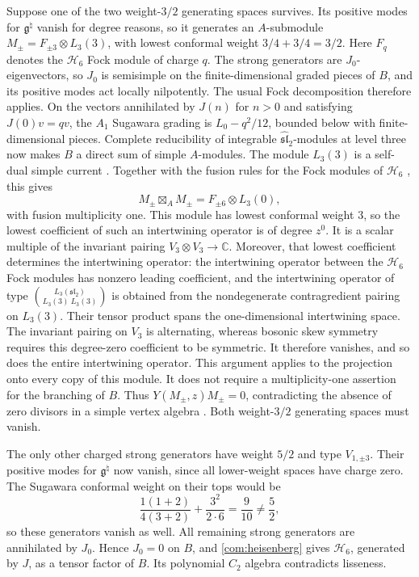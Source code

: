 \documentclass[11pt,a4paper]{amsart}
\numberwithin{equation}{section}
\theoremstyle{definition}
\theoremstyle{remark}
\newcommand{\C}{\mathbb C}
\newcommand{\g}{\mathfrak g}
\newcommand{\slg}{\mathfrak{sl}}
\begin{document}
Suppose one of the two weight-$3/2$ generating spaces survives.
Its positive modes for $\g^\natural$ vanish for degree reasons, so it generates
an $A$-submodule
$M_\pm=F_{\pm3}\otimes L_3(3)$, with lowest conformal weight
$3/4+3/4=3/2$. Here $F_q$ denotes the $\mathcal H_6$ Fock module
of charge $q$. The strong generators are $J_0$-eigenvectors, so $J_0$ is semisimple on
the finite-dimensional graded pieces of $B$, and its positive modes act locally nilpotently.
The usual Fock decomposition therefore applies. On the vectors annihilated by $J(n)$ for $n>0$ and satisfying
$J(0)v=qv$, the $A_1$ Sugawara grading is
$L_0-q^2/12$, bounded below with finite-dimensional pieces. Complete
reducibility of integrable $\widehat{\slg}_2$-modules at level three
\cite[Proposition~5.6]{DLMSimpleCurrents1996} now makes $B$ a direct
sum of simple $A$-modules. The module $L_3(3)$ is a
self-dual simple current \cite[Proposition~5.1]{DLMSimpleCurrents1996}.
Together with the fusion rules for the Fock modules of $\mathcal H_6$
\cite[Section~2.2]{CKLRHeisenberg2019}, this gives
$$
 M_\pm\boxtimes_A M_\pm
   =F_{\pm6}\otimes L_3(0),
$$
with fusion multiplicity one. This module has lowest conformal weight
$3$, so the lowest coefficient of such an intertwining operator is
of degree $z^0$. It is a scalar multiple of the invariant pairing
$V_3\otimes V_3\to\C$.
Moreover, that lowest coefficient determines the intertwining operator:
the intertwining operator between the $\mathcal H_6$ Fock modules
has nonzero leading coefficient, and the intertwining operator of
type $\binom{L_3(\slg_2)}{L_3(3)\ L_3(3)}$ is obtained from the
nondegenerate contragredient pairing on $L_3(3)$. Their tensor product
spans the one-dimensional intertwining space.
The invariant pairing on $V_3$ is alternating, whereas bosonic skew
symmetry requires this degree-zero coefficient to be symmetric.
It therefore vanishes, and so does the entire intertwining operator.
This argument applies to the projection onto every copy of this
module. It does not require a multiplicity-one assertion for the
branching of $B$. Thus $Y(M_\pm,z)M_\pm=0$, contradicting the absence
of zero divisors in a simple vertex algebra
\cite[Corollary~4.3]{DAndrea2008}. Both weight-$3/2$ generating spaces
must vanish.

The only other charged strong generators have weight $5/2$ and type
$V_{1,\pm3}$. Their positive modes for $\g^\natural$ now vanish, since all
lower-weight spaces have charge zero. The Sugawara conformal weight
on their tops would be
$$
 \frac{1(1+2)}{4(3+2)}+\frac{3^2}{2\cdot6}
 =\frac9{10}\ne\frac52,
$$
so these generators vanish as well. All remaining strong generators
are annihilated by $J_0$. Hence $J_0=0$ on $B$, and
\cref{com:heisenberg} gives $\mathcal H_6$, generated by $J$, as a tensor factor of $B$. Its polynomial $C_2$ algebra contradicts lisseness.
\end{document}
